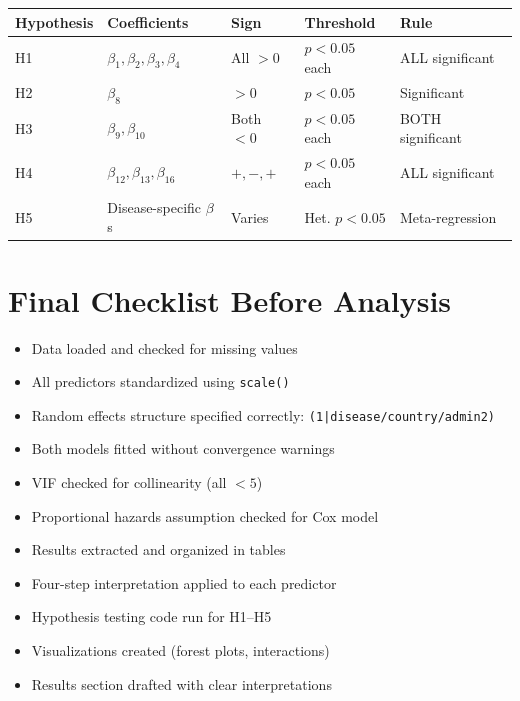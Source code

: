 \documentclass[11pt,a4paper]{article}
\begin{document}
\begin{table}[h]
\centering
\tiny
\begin{tabular}{@{}lllll@{}}
\toprule
\textbf{Hypothesis} & \textbf{Coefficients} & \textbf{Sign} & \textbf{Threshold} & \textbf{Rule} \\
\midrule
H1 & $\beta_1, \beta_2, \beta_3, \beta_4$ & All $> 0$ & $p < 0.05$ each & ALL significant \\
H2 & $\beta_8$ & $> 0$ & $p < 0.05$ & Significant \\
H3 & $\beta_9, \beta_{10}$ & Both $< 0$ & $p < 0.05$ each & BOTH significant \\
H4 & $\beta_{12}, \beta_{13}, \beta_{16}$ & $+, -, +$ & $p < 0.05$ each & ALL significant \\
H5 & Disease-specific $\beta$s & Varies & Het. $p < 0.05$ & Meta-regression \\
\bottomrule
\end{tabular}
\end{table}

\section{Final Checklist Before Analysis}

\begin{itemize}[label=$\square$]
    \item Data loaded and checked for missing values
    \item All predictors standardized using \texttt{scale()}
    \item Random effects structure specified correctly: \texttt{(1|disease/country/admin2)}
    \item Both models fitted without convergence warnings
    \item VIF checked for collinearity (all $< 5$)
    \item Proportional hazards assumption checked for Cox model
    \item Results extracted and organized in tables
    \item Four-step interpretation applied to each predictor
    \item Hypothesis testing code run for H1--H5
    \item Visualizations created (forest plots, interactions)
    \item Results section drafted with clear interpretations
\end{itemize}
\end{document}
